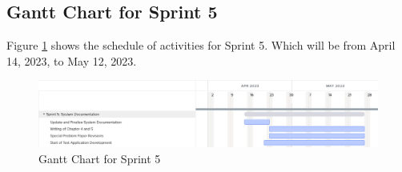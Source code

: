 \subsection{Gantt Chart for Sprint 5}
\label{subsec:gantt_chart_sprint5}
Figure \ref{fig:gantt_chart_sprint5} shows the schedule of activities for Sprint 5. 
Which will be from April 14, 2023, to May 12, 2023.
\begin{figure}[ht]
    \centering
    \includegraphics[width=1\textwidth]{./assets/Chapter_3/Gantt/Gantt_Chart_Sprint5.png}
    \caption{Gantt Chart for Sprint 5}
    \label{fig:gantt_chart_sprint5}
\end{figure}
\FloatBarrier